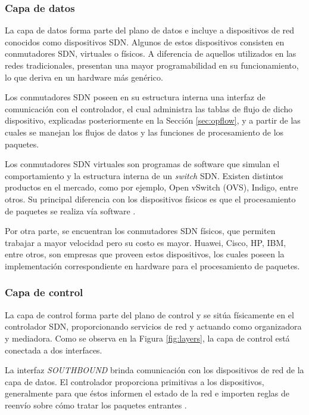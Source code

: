 \subsubsection*{Capa de datos}
La capa de datos forma parte del plano de datos e incluye a dispositivos de red
conocidos como dispositivos SDN. Algunos de estos dispositivos consisten en
conmutadores SDN, virtuales o físicos. A diferencia de aquellos utilizados en
las redes tradicionales, presentan una mayor programabilidad en su
funcionamiento, lo que deriva en un hardware más genérico.

Los conmutadores SDN poseen en su estructura interna una interfaz de
comunicación con el controlador, el cual administra las tablas de flujo de
dicho dispositivo, explicadas posteriormente en la Sección \ref{sec:opflow},
y a partir de las cuales se manejan los flujos de datos y las funciones de
procesamiento de los paquetes.

Los conmutadores SDN virtuales son programas de software que simulan el
comportamiento y la estructura interna de un \textit{switch} SDN. Existen distintos
productos en el mercado, como por ejemplo, Open vSwitch (OVS), Indigo, entre
otros. Su principal diferencia con los dispositivos físicos es que el
procesamiento de paquetes se realiza vía software \parencite{sdn_approach}.

Por otra parte, se encuentran los conmutadores SDN físicos, que permiten
trabajar a mayor velocidad pero su costo es mayor. Huawei, Cisco, HP, IBM,
entre otros, son empresas que proveen estos dispositivos, los cuales poseen
la implementación correspondiente en hardware para el procesamiento de paquetes.


\subsubsection*{Capa de control} \label{sec:control_layer}

La capa de control forma parte del plano de control y se sitúa físicamente en el
controlador SDN, proporcionando servicios de red y actuando como organizadora y
mediadora. Como se observa en la Figura \ref{fig:layers}, la capa de control
está conectada a dos interfaces.

La interfaz \textit{SOUTHBOUND} brinda comunicación con los dispositivos de red
de la capa de datos. El controlador proporciona primitivas a los dispositivos,
generalmente para que éstos informen el estado de la red e importen reglas de
reenvío sobre cómo tratar los paquetes entrantes \parencite{sdn_approach}.

